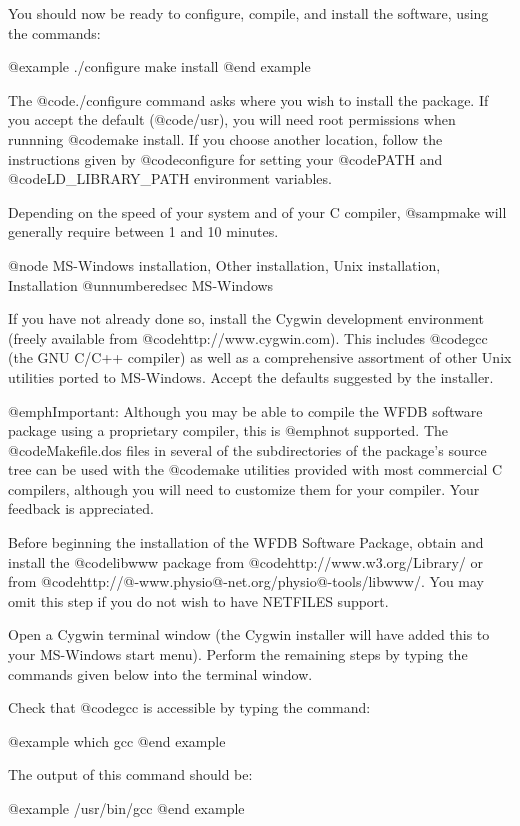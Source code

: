 {{{{{{{{{You should now be ready to configure, compile, and install the software, using
the commands:

@example
./configure
make install
@end example

The @code{./configure} command asks where you wish to install the package.
If you accept the default (@code{/usr}), you will need root permissions when
runnning @code{make install}.  If you choose another location, follow the
instructions given by @code{configure} for setting your @code{PATH} and
@code{LD_LIBRARY_PATH} environment variables.

Depending on the speed of your system and of your C compiler, @samp{make} will
generally require between 1 and 10 minutes.

@node MS-Windows installation, Other installation, Unix installation, Installation
@unnumberedsec MS-Windows

If you have not already done so, install the Cygwin development environment
(freely available from @code{http://www.cygwin.com}).  This
includes @code{gcc} (the GNU C/C++ compiler) as well as a comprehensive
assortment of other Unix utilities ported to MS-Windows.  Accept the defaults
suggested by the installer.

@emph{Important:} Although you may be able to compile the WFDB software package
using a proprietary compiler, this is @emph{not supported}.  The
@code{Makefile.dos} files in several of the subdirectories of the package's
source tree can be used with the @code{make} utilities provided with most
commercial C compilers, although you will need to customize them for your
compiler. Your feedback is appreciated.

Before beginning the installation of the WFDB Software Package, obtain and
install the @code{libwww} package from @code{http://www.w3.org/Library/} or
from @code{http://@-www.physio@-net.org/physio@-tools/libwww/}.  You may
omit this step if you do not wish to have NETFILES support.

Open a Cygwin terminal window (the Cygwin installer will have added this to
your MS-Windows start menu).  Perform the remaining steps by typing the
commands given below into the terminal window.

Check that @code{gcc} is accessible by typing the command:

@example
which gcc
@end example

The output of this command should be:

@example
/usr/bin/gcc
@end example

}}}}}}}}}

